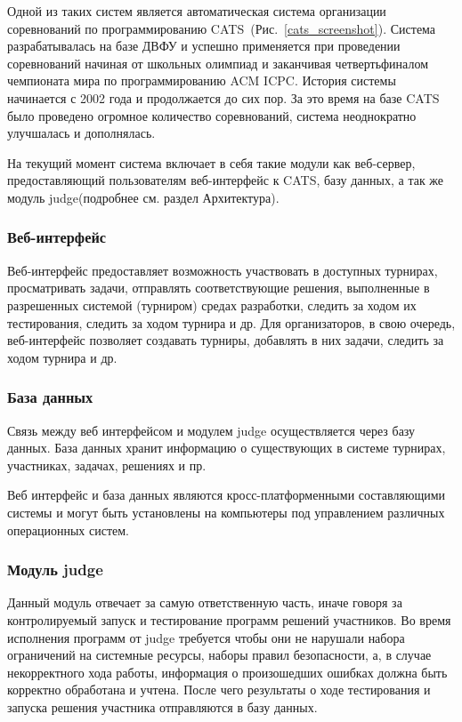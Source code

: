 \documentclass{imcs}
\begin{document}
Одной из таких систем является автоматическая система организации соревнований по программированию CATS\cite{cats}\cite{rozhkov}~(Рис.~\ref{cats_screenshot}).
Система разрабатывалась на базе ДВФУ и успешно применяется при проведении соревнований начиная от школьных олимпиад и заканчивая четвертьфиналом чемпионата мира по программированию ACM ICPC.
История системы начинается с 2002 года и продолжается до сих пор.
За это время на базе CATS было проведено огромное количество соревнований, система неоднократно улучшалась и дополнялась\cite{rozhkov}\cite{matvienko}\cite{konovalova}\cite{perepechin}\cite{tuphanov}.

На текущий момент система включает в себя такие модули как веб-сервер, предоставляющий пользователям веб-интерфейс к CATS, базу данных, а так же модуль judge\cite{rozhkov}(подробнее см. раздел Архитектура).
\subsubsection{Веб-интерфейс}

Веб-интерфейс предоставляет возможность участвовать в доступных турнирах, просматривать задачи, отправлять соответствующие решения, выполненные в разрешенных системой (турниром) средах разработки, следить за ходом их тестирования, следить за ходом турнира и др. Для организаторов, в свою очередь, веб-интерфейс позволяет создавать турниры, добавлять в них задачи, следить за ходом турнира и др.
\FloatBarrier
\subsubsection{База данных}

Связь между веб интерфейсом и модулем judge осуществляется через базу данных.
База данных хранит информацию о существующих в системе турнирах, участниках, задачах, решениях и пр.

Веб интерфейс и база данных являются кросс-платформенными составляющими системы и могут быть установлены на компьютеры под управлением различных операционных систем.

\subsubsection{Модуль judge}

Данный модуль отвечает за самую ответственную часть, иначе говоря за контролируемый запуск и тестирование программ решений участников.
Во время исполнения программ от judge требуется чтобы они не нарушали набора ограничений на системные ресурсы, наборы правил безопасности, а, в случае некорректного хода работы, информация о произошедших ошибках должна быть корректно обработана и учтена.
После чего результаты о ходе тестирования и запуска решения участника отправляются в базу данных.
\end{document}
